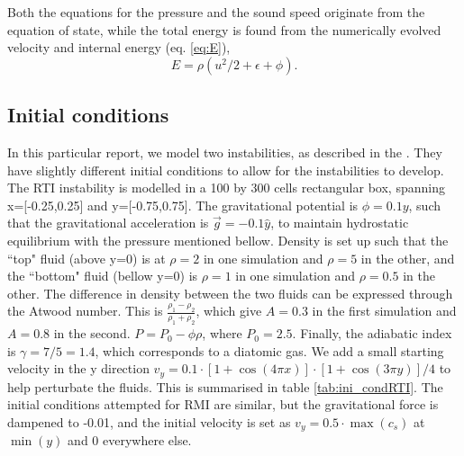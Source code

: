 \documentclass[a4paper,12pt]{article}
\begin{document}
Both the equations for the pressure and the sound speed originate from the equation of state, while the total energy is found from the numerically evolved velocity and internal energy (eq. \ref{eq:E}),
\begin{equation}
  \label{eq:E}
  E = \rho(u^2/2 + \epsilon + \phi).
\end{equation}

\subsection{Initial conditions}
\label{subsec:inicond}
In this particular report, we model two instabilities, as described in the . They have slightly different initial conditions to allow for the instabilities to develop. The RTI instability is modelled in a 100 by 300 cells rectangular box, spanning x=[-0.25,0.25] and y=[-0.75,0.75]. The gravitational potential is $\phi = 0.1y$, such that the gravitational acceleration is $\vec{g} = -0.1\hat{y}$, to maintain hydrostatic equilibrium with the pressure mentioned bellow. Density is set up such that the ``top" fluid (above y=0) is at $\rho=2$ in one simulation and $\rho=5$ in the other, and the ``bottom" fluid (bellow y=0) is $\rho=1$ in one simulation and $\rho=0.5$ in the other. The difference in density between the two fluids can be expressed through the Atwood number. This is $\frac{\rho_1 - \rho_2}{\rho_1 + \rho_2}$, which give $A=0.3$ in the first simulation and $A=0.8$ in the second. $P = P_0 - \phi \rho$, where $P_0=2.5$. Finally, the adiabatic index is $\gamma = 7/5 = 1.4$, which corresponds to a diatomic gas. We add a small starting velocity in the y direction $v_y = 0.1\cdot[1 + \cos(4\pi x)]\cdot[1+\cos(3\pi y)]/4$ to help perturbate the fluids. This is summarised in table \ref{tab:ini_condRTI}. The initial conditions attempted for RMI are similar, but the gravitational force is dampened to -0.01, and the initial velocity is set as $v_y = 0.5\cdot \max(c_s)$ at $\min(y)$ and 0 everywhere else.
\end{document}
